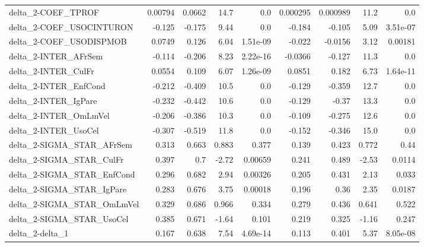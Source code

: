 \begin{tabular}{lrrrrrrrr}
delta\_2-COEF\_TPROF                    &     0.00794 &       0.0662 &    14.7 &      0.0 &   0.000295 &    0.000989 &         11.2 &           0.0 \\
delta\_2-COEF\_USOCINTURON              &      -0.125 &       -0.175 &    9.44 &      0.0 &     -0.184 &      -0.105 &         5.09 &      3.51e-07 \\
delta\_2-COEF\_USODISPMOB               &      0.0749 &        0.126 &    6.04 & 1.51e-09 &     -0.022 &     -0.0156 &         3.12 &       0.00181 \\
delta\_2-INTER\_AFrSem                  &      -0.114 &       -0.206 &    8.23 & 2.22e-16 &    -0.0366 &      -0.127 &         11.3 &           0.0 \\
delta\_2-INTER\_CulFr                   &      0.0554 &        0.109 &    6.07 & 1.26e-09 &     0.0851 &       0.182 &         6.73 &      1.64e-11 \\
delta\_2-INTER\_EnfCond                 &      -0.212 &       -0.409 &    10.5 &      0.0 &     -0.129 &      -0.359 &         12.7 &           0.0 \\
delta\_2-INTER\_IgPare                  &      -0.232 &       -0.442 &    10.6 &      0.0 &     -0.129 &       -0.37 &         13.3 &           0.0 \\
delta\_2-INTER\_OmLmVel                 &      -0.206 &       -0.386 &    10.3 &      0.0 &     -0.109 &      -0.275 &         12.6 &           0.0 \\
delta\_2-INTER\_UsoCel                  &      -0.307 &       -0.519 &    11.8 &      0.0 &     -0.152 &      -0.346 &         15.0 &           0.0 \\
delta\_2-SIGMA\_STAR\_AFrSem             &       0.313 &        0.663 &   0.883 &    0.377 &      0.139 &       0.423 &        0.772 &          0.44 \\
delta\_2-SIGMA\_STAR\_CulFr              &       0.397 &          0.7 &   -2.72 &  0.00659 &      0.241 &       0.489 &        -2.53 &        0.0114 \\
delta\_2-SIGMA\_STAR\_EnfCond            &       0.296 &        0.682 &    2.94 &  0.00326 &      0.205 &       0.431 &         2.13 &         0.033 \\
delta\_2-SIGMA\_STAR\_IgPare             &       0.283 &        0.676 &    3.75 &  0.00018 &      0.196 &        0.36 &         2.35 &        0.0187 \\
delta\_2-SIGMA\_STAR\_OmLmVel            &       0.329 &        0.686 &   0.966 &    0.334 &      0.279 &       0.436 &        0.641 &         0.522 \\
delta\_2-SIGMA\_STAR\_UsoCel             &       0.385 &        0.671 &   -1.64 &    0.101 &      0.219 &       0.325 &        -1.16 &         0.247 \\
delta\_2-delta\_1                       &       0.167 &        0.638 &    7.54 & 4.69e-14 &      0.113 &       0.401 &         5.37 &      8.05e-08 \\
\bottomrule
\end{tabular}
